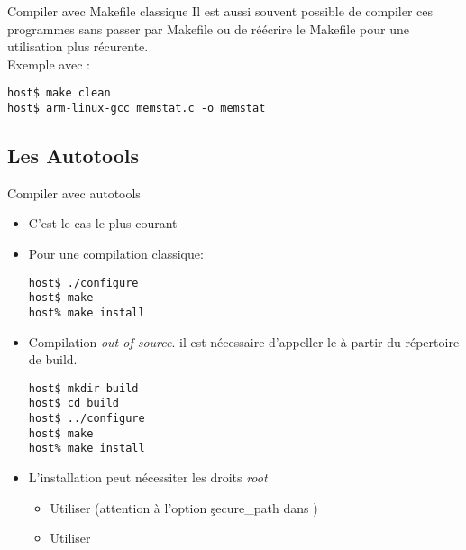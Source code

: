 \begin{frame}[fragile=singleslide]{Compiler avec Makefile classique}
  Il est aussi souvent possible de compiler ces programmes sans passer
  par Makefile  ou de réécrire  le Makefile pour une  utilisation plus
  récurente.
  \\[2ex]
  Exemple avec :
\begin{lstlisting}
host$ make clean
host$ arm-linux-gcc memstat.c -o memstat
\end{lstlisting} %
\end{frame}

\subsection{Les Autotools}

\begin{frame}[fragile=singleslide]{Compiler avec autotools}
  \begin{itemize}
  \item C'est le cas le plus courant
  \item Pour une compilation classique:
    \begin{lstlisting}
host$ ./configure
host$ make
host% make install
    \end{lstlisting} %
  \item Compilation \emph{out-of-source}. il est nécessaire d'appeller
    le  à partir du répertoire de build.
    \begin{lstlisting}
host$ mkdir build
host$ cd build
host$ ../configure
host$ make
host% make install
    \end{lstlisting} %
  \item L'installation peut nécessiter les droits \emph{root}
    \begin{itemize} 
    \item Utiliser  (attention à l'option \c{secure_path}
      dans )
    \item Utiliser 
    \end{itemize} 
  \end{itemize}
\end{frame}

